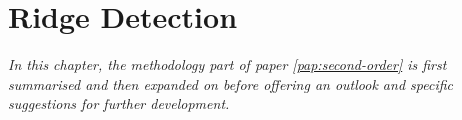 \chapter{Ridge Detection}
\label{chap:erm}
\textit{In this chapter, the methodology part of paper \ref{pap:second-order} is first summarised and then expanded on before offering an outlook and specific suggestions for further development.}




